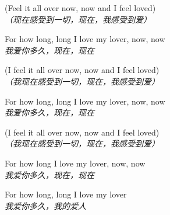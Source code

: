 \begin{spacing}{1.5}
\begin{flushleft}
(Feel it all over now, now and I feel loved)\\
\textit{（现在感受到一切，现在，我感受到爱）}\lyricspace

For how long, long I love my lover, now, now\\
\textit{我爱你多久，现在，现在}\lyricspace

(I feel it all over now, now and I feel loved)\\
\textit{（我现在感受到一切，现在，我感受到爱）}\lyricspace

For how long, long I love my lover, now, now\\
\textit{我爱你多久，现在，现在}\lyricspace

(I feel it all over now, now and I feel loved)\\
\textit{（我现在感受到一切，现在，我感受到爱）}\lyricspace

For how long I love my lover, now, now\\
\textit{我爱你多久，现在，现在}\lyricspace

For how long, long I love my lover\\
\textit{我爱你多久，我的爱人}\lyricspace
\end{flushleft}
\end{spacing} 
